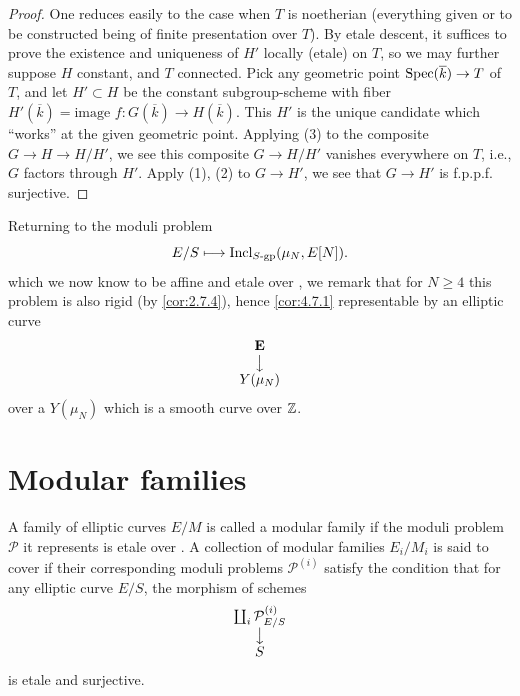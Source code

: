 \begin{proof}
One reduces easily to the case when $T$ is noetherian (everything given or to be constructed being of finite presentation over $T$). By etale descent, it suffices to prove the existence and uniqueness of $H'$ locally (etale) on $T$, so we may further suppose $H$ constant, and $T$ connected. Pick any geometric point $\operatorname{Spec}(\overline{k}) \to T$ of $T$, and let $H' \subset H$ be the constant subgroup-scheme with fiber $H'(\overline{k}) = \text{image } f : G(\overline{k}) \to H(\overline{k})$. This $H'$ is the unique candidate which ``works'' at the given geometric point. Applying (3) to the composite $G \to H \to H/H'$, we see this composite $G \to H/H'$ vanishes everywhere on $T$, i.e., $G$ factors through $H'$. Apply (1), (2) to $G \to H'$, we see that $G \to H'$ is f.p.p.f. surjective.
\end{proof}

Returning to the moduli problem
\[
E/S \longmapsto \operatorname{Incl}_{S\text{-gp}}(\mu_N, E[N]).
\]
which we now know to be affine and etale over \Ell, we remark that for $N \ge 4$ this problem is also rigid (by \ref{cor:2.7.4}), hence \ref{cor:4.7.1} representable by an elliptic curve
\[
\begin{array}{@{}c@{}}
\mathbf{E} \\ \big\downarrow \\ Y(\mu_N)
\end{array}
\]
over a $Y(\mu_N)$ which is a smooth curve over $\mathbb{Z}$.

\section{Modular families}
\label{sec:4.11}

A family of elliptic curves $E/M$ is called a modular family if the moduli problem $\mathcal{P}$ it represents is etale over \Ell. A collection of modular families $E_i/M_i$ is said to cover \Ell if their corresponding moduli problems $\mathcal{P}^{(i)}$ satisfy the condition that for any elliptic curve $E/S$, the morphism of schemes
\[
\begin{array}{@{}c@{}}
\coprod_i \mathcal{P}^{(i)}_{E/S} \\ \big\downarrow \\ S
\end{array}
\]
is etale and surjective.

